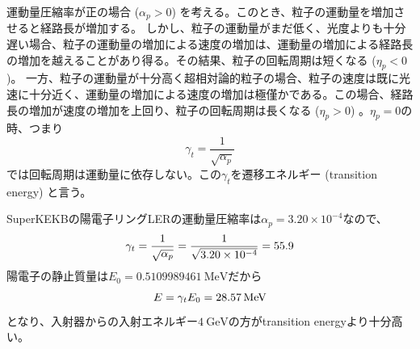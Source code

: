 \documentclass[10pt,a4paper]{ltjsarticle}
\begin{document}
運動量圧縮率が正の場合 ($\alpha_p>0$) を考える。このとき、粒子の運動量を増加させると経路長が増加する。 しかし、粒子の運動量がまだ低く、光度よりも十分遅い場合、粒子の運動量の増加による速度の増加は、運動量の増加による経路長の増加を越えることがあり得る。その結果、粒子の回転周期は短くなる ($\eta_p < 0$)。
一方、粒子の運動量が十分高く超相対論的粒子の場合、粒子の速度は既に光速に十分近く、運動量の増加による速度の増加は極僅かである。この場合、経路長の増加が速度の増加を上回り、粒子の回転周期は長くなる ($\eta_p>0$) 。$\eta_p = 0$の時、つまり
%
\begin{equation}
  \gamma_t = \frac{1}{\sqrt{\alpha_p}}
\end{equation}
%
では回転周期は運動量に依存しない。この$\gamma_t$を遷移エネルギー (transition energy) と言う。

\vspace{\baselineskip}

\begin{tcolorbox}[title=\textgt{SuperKEKB LERのtransition energy}]
  SuperKEKBの陽電子リングLERの運動量圧縮率は$\alpha_p = 3.20 \times 10^{-4}$なので、
  \begin{equation}
    \gamma_t = \frac{1}{\sqrt{\alpha_p}}= \frac{1}{\sqrt{3.20 \times 10^{-4}}} = 55.9 \notag
  \end{equation}
  陽電子の静止質量は$E_0 = \SI{0.5109989461}{\mega\electronvolt}$だから
  \begin{equation}
    E = \gamma_t E_0 = \SI{28.57}{\mega\electronvolt} \notag
  \end{equation}
  となり、入射器からの入射エネルギー$\SI{4}{\giga\electronvolt}$の方がtransition energyより十分高い。
\end{tcolorbox}
\end{document}
